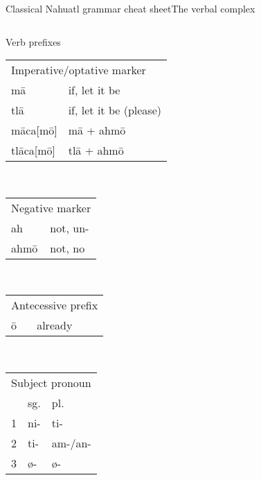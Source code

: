 \documentclass[12pt]{beamer}
\newcommand{\nah}[1]{\textcolor{nahgrn}{#1}}
\newcommand{\trs}[1]{\textcolor{nahblu}{#1}}
\begin{document}
\begin{frame}%
  {Classical Nahuatl grammar cheat sheet}{The verbal complex}
  \begin{columns}[t]
    \begin{column}{0.18\linewidth}
      \begin{block}{Verb prefixes}
        \begin{tabular}[t]{ll}
          \multicolumn{2}{l}{Imperative/optative marker} \\
          \nah{mā}        & \trs{if, let it be}          \\
          \nah{tlā}       & \trs{if, let it be (please)} \\
          \nah{māca[mō]}  & \nah{mā + ahmō}              \\
          \nah{tlāca[mō]} & \nah{tlā + ahmō}             \\
        \end{tabular}
        \\[1ex]
        \begin{tabular}[t]{ll}
          \multicolumn{2}{l}{Negative marker} \\
          \nah{ah}   & \trs{not, un-}         \\
          \nah{ahmō} & \trs{not, no}          \\
        \end{tabular}
        \\[1ex]
        \begin{tabular}[t]{ll}
          \multicolumn{2}{l}{Antecessive prefix} \\
          \nah{ō} & \trs{already}                \\
        \end{tabular}
        \\[1ex]
        \begin{threeparttable}
          \begin{tabular}[t]{lll}
            \multicolumn{3}{l}{Subject pronoun}             \\
              & sg.                & pl.                    \\
            1 & \nah{ni-}          & \nah{ti-}              \\
            2 & \nah{ti-}\tnote{1} & \nah{am-/an-}\tnote{1} \\
            3 & \nah{ø-}           & \nah{ø-}               \\
          \end{tabular}
          \begin{tablenotes}

\end{tablenotes}
\end{threeparttable}
\end{block}
\end{column}
\end{columns}
\end{frame}
\end{document}
